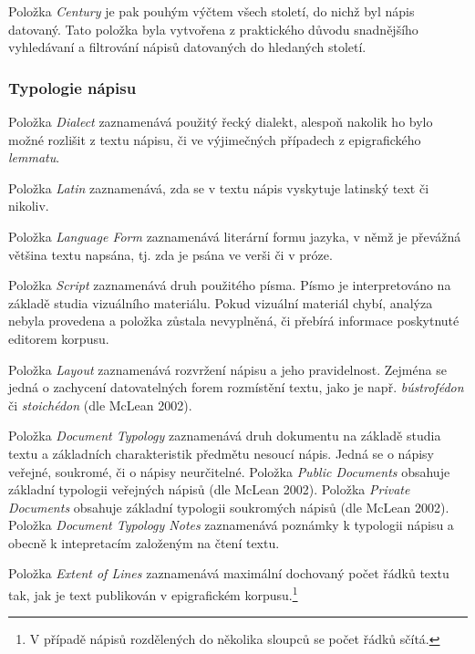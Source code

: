Položka {\em Century} je pak pouhým výčtem všech století, do nichž byl nápis datovaný. Tato položka byla vytvořena z praktického důvodu snadnějšího vyhledávaní a filtrování nápisů datovaných do hledaných století.

\subsubsection[typologie-nápisu]{Typologie nápisu}

\startitemize
\item
  \startblockquote
  Položka {\em Dialect} zaznamenává použitý řecký dialekt, alespoň nakolik ho bylo možné rozlišit z textu nápisu, či ve výjimečných případech z epigrafického {\em lemmatu}.
  \stopblockquote
\item
  \startblockquote
  Položka {\em Latin} zaznamenává, zda se v textu nápis vyskytuje latinský text či nikoliv.
  \stopblockquote
\item
  \startblockquote
  Položka {\em Language Form} zaznamenává literární formu jazyka, v němž je převážná většina textu napsána, tj. zda je psána ve verši či v próze.
  \stopblockquote
\item
  \startblockquote
  Položka {\em Script} zaznamenává druh použitého písma. Písmo je interpretováno na základě studia vizuálního materiálu. Pokud vizuální materiál chybí, analýza nebyla provedena a položka zůstala nevyplněná, či přebírá informace poskytnuté editorem korpusu.
  \stopblockquote
\item
  \startblockquote
  Položka {\em Layout} zaznamenává rozvržení nápisu a jeho pravidelnost. Zejména se jedná o zachycení datovatelných forem rozmístění textu, jako je např. {\em bústrofédon} či {\em stoichédon} (dle McLean 2002).
  \stopblockquote
\item
  \startblockquote
  Položka {\em Document Typology} zaznamenává druh dokumentu na základě studia textu a základních charakteristik předmětu nesoucí nápis. Jedná se o nápisy veřejné, soukromé, či o nápisy neurčitelné. Položka {\em Public Documents} obsahuje základní typologii veřejných nápisů (dle McLean 2002). Položka {\em Private Documents} obsahuje základní typologii soukromých nápisů (dle McLean 2002). Položka {\em Document Typology Notes} zaznamenává poznámky k typologii nápisu a obecně k intepretacím založeným na čtení textu.
  \stopblockquote
\item
  \startblockquote
  Položka {\em Extent of Lines} zaznamenává maximální dochovaný počet řádků textu tak, jak je text publikován v epigrafickém korpusu.\footnote{V případě nápisů rozdělených do několika sloupců se počet řádků sčítá.}
  \stopblockquote
\stopitemize

